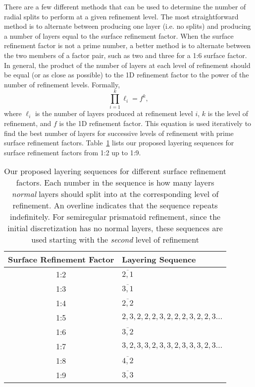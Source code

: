 There are a few different methods that can be used to determine the number of radial splits to perform at a given refinement level.
The most straightforward method is to alternate between producing one layer (i.e.
no splits) and producing a number of layers equal to the surface refinement factor.
When the surface refinement factor is not a prime number, a better method is to alternate between the two members of a factor pair, such as two and three for a 1:6 surface factor.
In general, the product of the number of layers at each level of refinement should be equal (or as close as possible) to the 1D refinement factor to the power of the number of refinement levels.
Formally,
%
\begin{equation*}
\prod_{i = 1}^{k} \ell_{i} = f^{k},
\end{equation*}
%
where $\ell_{i}$ is the number of layers produced at refinement level $i$, $k$ is the level of refinement, and $f$ is the 1D refinement factor.
This equation is used iteratively to find the best number of layers for successive levels of refinement with prime surface refinement factors.
Table~\ref{tab:layers} lists our proposed layering sequences for surface refinement factors from 1:2 up to 1:9.


\begin{table}[ht!]
	\centering
	\caption[Layering sequences for different surface refinement factors]{
		Our proposed layering sequences for different surface refinement factors.
		Each number in the sequence is how many layers \textit{normal} layers should split into at the corresponding level of refinement.
		An overline indicates that the sequence repeats indefinitely.
		For semiregular prismatoid refinement, since the initial discretization has no normal layers, these sequences are used starting with the \textit{second} level of refinement
	}
	\begin{tabular}{@{} c l @{}}
		\toprule
		Surface Refinement Factor & Layering Sequence         \\ \midrule
		1:2                  & $\overline{2,1}$               \\
		1:3                  & $\overline{3,1}$               \\
		1:4                  & $\overline{2,2}$               \\
		1:5                  & $2,3,2,2,2,3,2,2,2,3,2,2,3...$ \\
		1:6                  & $\overline{3,2}$               \\
		1:7                  & $3,2,3,3,2,3,3,2,3,3,3,2,3...$ \\
		1:8                  & $\overline{4,2}$               \\
		1:9                  & $\overline{3,3}$               \\ \bottomrule
	\end{tabular}
	\label{tab:layers}
\end{table}


